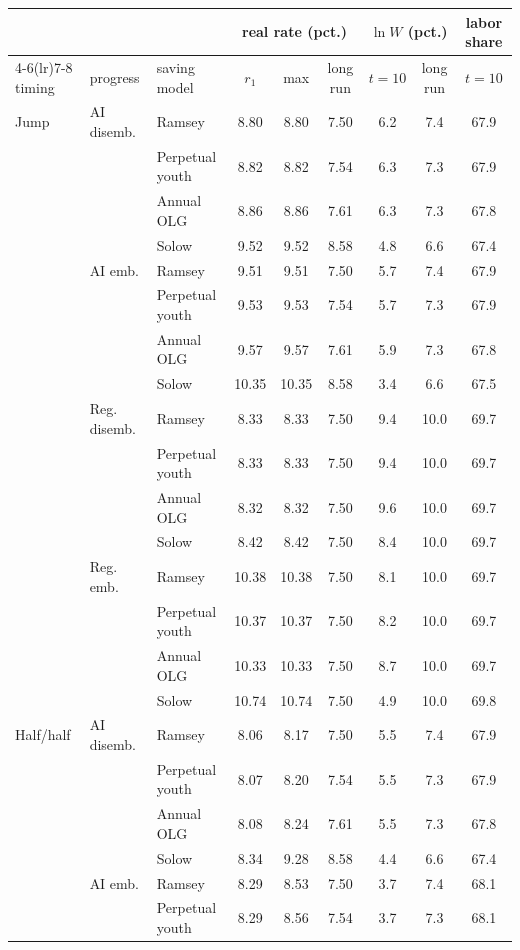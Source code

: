 \begin{tabular}{lllcccccc}\toprule
 & & & \multicolumn{3}{c}{real rate (pct.)} & \multicolumn{2}{c}{$\ln W$ (pct.)} & labor share\\
\cmidrule(lr){4-6}\cmidrule(lr){7-8}
timing & progress & saving model & $r_1$ & max & long run & $t{=}10$ & long run & $t{=}10$\\\midrule
Jump & AI disemb. & Ramsey & 8.80 & 8.80 & 7.50 & 6.2 & 7.4 & 67.9\\
 &  & Perpetual youth & 8.82 & 8.82 & 7.54 & 6.3 & 7.3 & 67.9\\
 &  & Annual OLG & 8.86 & 8.86 & 7.61 & 6.3 & 7.3 & 67.8\\
 &  & Solow & 9.52 & 9.52 & 8.58 & 4.8 & 6.6 & 67.4\\
 & AI emb. & Ramsey & 9.51 & 9.51 & 7.50 & 5.7 & 7.4 & 67.9\\
 &  & Perpetual youth & 9.53 & 9.53 & 7.54 & 5.7 & 7.3 & 67.9\\
 &  & Annual OLG & 9.57 & 9.57 & 7.61 & 5.9 & 7.3 & 67.8\\
 &  & Solow & 10.35 & 10.35 & 8.58 & 3.4 & 6.6 & 67.5\\
 & Reg. disemb. & Ramsey & 8.33 & 8.33 & 7.50 & 9.4 & 10.0 & 69.7\\
 &  & Perpetual youth & 8.33 & 8.33 & 7.50 & 9.4 & 10.0 & 69.7\\
 &  & Annual OLG & 8.32 & 8.32 & 7.50 & 9.6 & 10.0 & 69.7\\
 &  & Solow & 8.42 & 8.42 & 7.50 & 8.4 & 10.0 & 69.7\\
 & Reg. emb. & Ramsey & 10.38 & 10.38 & 7.50 & 8.1 & 10.0 & 69.7\\
 &  & Perpetual youth & 10.37 & 10.37 & 7.50 & 8.2 & 10.0 & 69.7\\
 &  & Annual OLG & 10.33 & 10.33 & 7.50 & 8.7 & 10.0 & 69.7\\
 &  & Solow & 10.74 & 10.74 & 7.50 & 4.9 & 10.0 & 69.8\\
\midrule
Half/half & AI disemb. & Ramsey & 8.06 & 8.17 & 7.50 & 5.5 & 7.4 & 67.9\\
 &  & Perpetual youth & 8.07 & 8.20 & 7.54 & 5.5 & 7.3 & 67.9\\
 &  & Annual OLG & 8.08 & 8.24 & 7.61 & 5.5 & 7.3 & 67.8\\
 &  & Solow & 8.34 & 9.28 & 8.58 & 4.4 & 6.6 & 67.4\\
 & AI emb. & Ramsey & 8.29 & 8.53 & 7.50 & 3.7 & 7.4 & 68.1\\
 &  & Perpetual youth & 8.29 & 8.56 & 7.54 & 3.7 & 7.3 & 68.1\\

\end{tabular}
